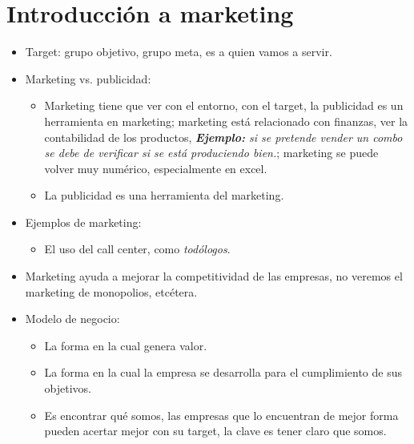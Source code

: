 \section{Introducción a marketing}
\begin{itemize}
    \item Target: grupo objetivo, grupo meta, es a quien vamos a servir.
    \item Marketing vs. publicidad:
        \begin{itemize}
            \item Marketing tiene que ver con el entorno, con el target, la publicidad es un herramienta en marketing; marketing está relacionado con finanzas, ver la contabilidad de los productos, \emph{\textbf{Ejemplo: }si se pretende vender un combo se debe de verificar si se está produciendo bien.}; marketing se puede volver muy numérico, especialmente en excel. 
            \item La publicidad es una herramienta del marketing. 
        \end{itemize}

    \item Ejemplos de marketing: 
        \begin{itemize}
            \item El uso del call center, como \emph{todólogos}.
        \end{itemize}

    \item Marketing ayuda a mejorar la competitividad de las empresas, no veremos el marketing de monopolios, etcétera.
    \item Modelo de negocio:
        \begin{itemize}
            \item La forma en la cual genera valor.
            \item La forma  en la cual la empresa se desarrolla para el cumplimiento de sus objetivos.
            \item Es encontrar qué somos, las empresas que lo encuentran de mejor forma pueden acertar mejor con su target, la clave es tener claro que somos.
        \end{itemize}
    

\end{itemize}
